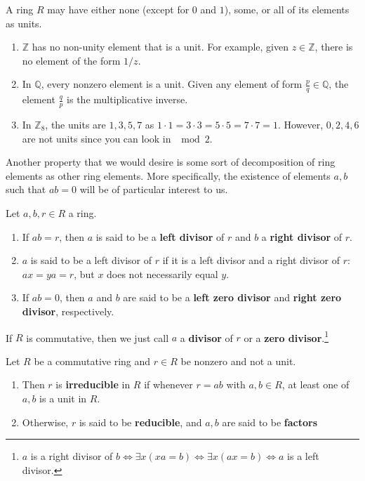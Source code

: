   \begin{example}
    \label{ex:units-and-non-units}
    A ring $R$ may have either none (except for $0$ and $1$), some, or all of its elements as units. 
    \begin{enumerate}
      \item $\mathbb{Z}$ has no non-unity element that is a unit. For example, given $z \in \mathbb{Z}$, there is no element of the form $1/z$.  
      \item In $\mathbb{Q}$, every nonzero element is a unit. Given any element of form $\frac{p}{q} \in \mathbb{Q}$, the element $\frac{q}{p}$ is the multiplicative inverse. 
      \item In $\mathbb{Z}_8$, the units are $1, 3, 5, 7$ as $1 \cdot 1 = 3 \cdot 3 = 5 \cdot 5 = 7 \cdot 7 = 1$. However, $0, 2, 4, 6$ are not units since you can look in $\mod{2}$. 
    \end{enumerate}
  \end{example}

  Another property that we would desire is some sort of decomposition of ring elements as other ring elements. More specifically, the existence of elements $a, b$ such that $ab = 0$ will be of particular interest to us. 

  \begin{definition}
    \label{def:left-right-divisor}
    Let $a, b, r \in R$ a ring. 
    \begin{enumerate}
      \item If $ab = r$, then $a$ is said to be a \textbf{left divisor} of $r$ and $b$ a \textbf{right divisor} of $r$. 

      \item $a$ is said to be a left divisor of $r$ if it is a left divisor and a right divisor of $r$: $ax = ya = r$, but $x$ does not necessarily equal $y$. 

      \item If $ab = 0$, then $a$ and $b$ are said to be a \textbf{left zero divisor} and \textbf{right zero divisor}, respectively. 
    \end{enumerate}
    If $R$ is commutative, then we just call $a$ a \textbf{divisor} of $r$ or a \textbf{zero divisor}.\footnote{$a$ is a right divisor of $b \iff \exists x (xa = b) \iff \exists x (ax = b) \iff a$ is a left divisor. } 
  \end{definition}

  \begin{definition}
    \label{def:reducibility-of-elements}
    Let $R$ be a commutative ring and $r \in R$ be nonzero and not a unit. 
    \begin{enumerate}
      \item Then $r$ is \textbf{irreducible} in $R$ if whenever $r = ab$ with $a, b \in R$, at least one of $a, b$ is a unit in $R$. 
      \item Otherwise, $r$ is said to be \textbf{reducible}, and $a, b$ are said to be \textbf{factors}
    \end{enumerate}
  \end{definition}
  
